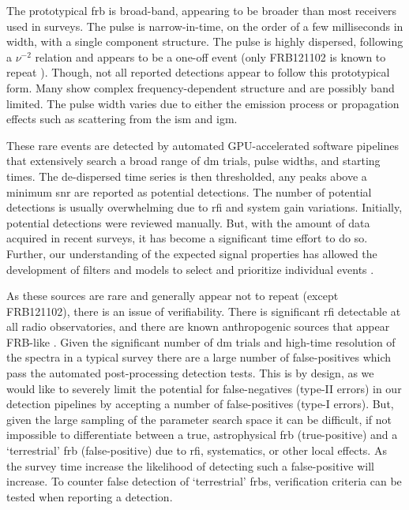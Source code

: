 \documentclass[a4paper,fleqn,usenatbib]{mnras}
\begin{document}
The prototypical \gls{frb} is broad-band, appearing to be broader than most
receivers used in surveys. The pulse is narrow-in-time, on the order of a few
milliseconds in width, with a single component structure. The pulse is highly
dispersed, following a $\nu^{-2}$ relation and appears to be a one-off event
(only FRB121102 is known to repeat \citep{2016Natur.531..202S}).  Though, not
all reported detections appear to follow this prototypical form. Many show
complex frequency-dependent structure and are possibly band limited. The pulse
width varies due to either the emission process or propagation effects such as
scattering from the \gls{ism} and \gls{igm}.

These rare events are detected by automated GPU-accelerated software pipelines
that extensively search a broad range of \gls{dm} trials, pulse widths, and
starting times.  The de-dispersed time series is then thresholded, any
peaks above a minimum \gls{snr} are reported as potential detections. The number
of potential detections is usually overwhelming due to \gls{rfi} and system gain
variations. Initially, potential detections were reviewed manually. But, with
the amount of data acquired in recent surveys, it has become a significant time
effort to do so. Further, our understanding of the expected signal properties
has allowed the development of filters and models to select and prioritize
individual events \citep{2018MNRAS.474.3847F}.

As these sources are rare and generally appear not to repeat (except FRB121102),
there is an issue of verifiability. There is significant \gls{rfi} detectable at
all radio observatories, and there are known anthropogenic sources that appear
FRB-like \citep{2011ApJ...727...18B}.  Given the significant number of \gls{dm}
trials and high-time resolution of the spectra in a typical survey there are a
large number of false-positives which pass the automated post-processing
detection tests.  This is by design, as we would like to severely limit the
potential for false-negatives (type-II errors) in our detection pipelines by
accepting a number of false-positives (type-I errors).  But, given the large
sampling of the parameter search space it can be difficult, if not impossible to
differentiate between a true, astrophysical \gls{frb} (true-positive) and a
`terrestrial' \gls{frb} (false-positive) due to \gls{rfi}, systematics, or other
local effects. As the survey time increase the likelihood of detecting such a
false-positive will increase. To counter false detection of `terrestrial'
\glspl{frb}, verification criteria can be tested when reporting a detection.
\end{document}
